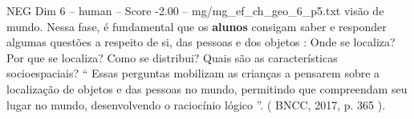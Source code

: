 \begin{textsample}{NEG Dim 6 – human – Score -2.00 – mg/mg\_ef\_ch\_geo\_6\_p5.txt}  \label{ex:f6_neg_012}
visão de mundo.
Nessa fase, é fundamental que os \textbf{alunos} consigam saber e responder algumas questões a respeito de si, das pessoas e dos objetos : Onde se localiza?
Por que se localiza?
Como se distribui?
Quais são as características socioespaciais? “ Essas perguntas mobilizam as crianças a pensarem sobre a localização de objetos e das pessoas no mundo, permitindo que compreendam seu lugar no mundo, desenvolvendo o raciocínio lógico ”. ( BNCC, 2017, p. 365 ).

\end{textsample}
